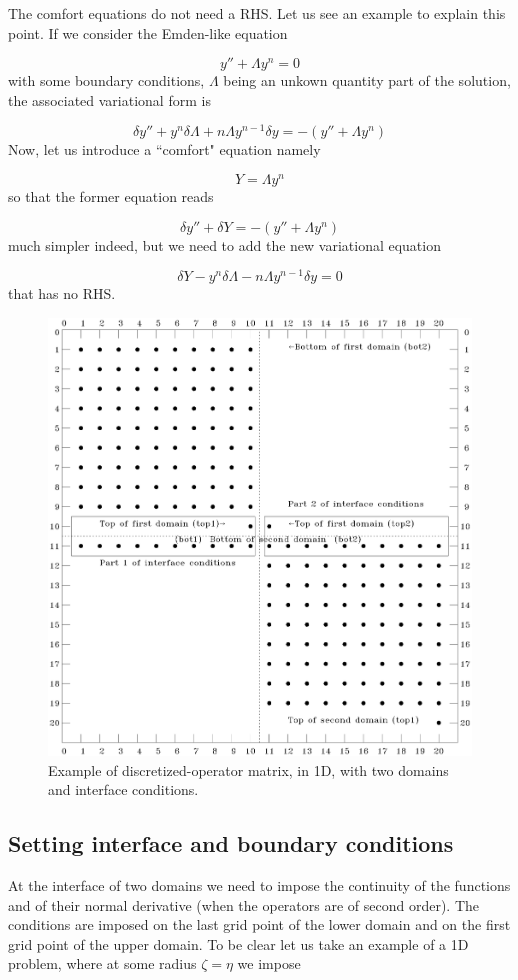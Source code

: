 The comfort equations do not need a RHS. Let us see an example to explain
this point. If we consider the Emden-like equation

\[ y''+\Lambda y^n = 0\]
with some boundary conditions, $\Lambda$ being an unkown quantity part
of the solution, the associated variational form is

\[ \delta y'' + y^n\delta\Lambda + n\Lambda y^{n-1}\delta y = -(y''+\Lambda y^n)\]
Now, let us introduce a ``comfort" equation namely

\[ Y=\Lambda y^n\]
so that the former equation reads

\[ \delta y'' + \delta Y = -(y''+\Lambda y^n)\]
much simpler indeed, but we need to add the new variational equation

\[ \delta Y - y^n\delta\Lambda - n\Lambda y^{n-1}\delta y = 0\]
that has no RHS.



\begin{figure}[t]
\centering
\includegraphics[width=0.8\linewidth]{fig/matrix_pedago.eps}
\caption{Example of discretized-operator matrix, in 1D, with two domains and
interface conditions.}
\label{matp}
\end{figure}

\subsection{Setting interface and boundary conditions}

At the interface of two domains we need to impose the continuity of the
functions and of their normal derivative (when the operators are of
second order). The conditions are imposed on the last grid point of the
lower domain and on the first grid point of the upper domain. To be
clear let us take an example of a 1D problem, where at some radius
$\zeta=\eta$ we impose

